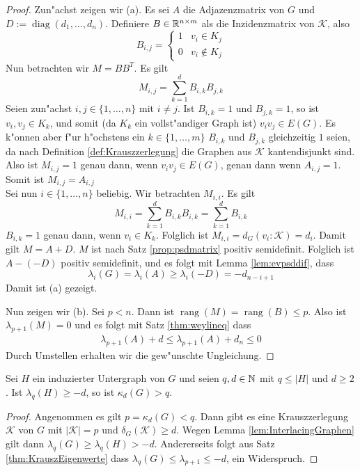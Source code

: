 \begin{proof}
    Zun"achst zeigen wir (a). Es sei $A$ die Adjazenzmatrix von $G$ und $D := \operatorname{diag}(d_1,\dots,d_n)$. Definiere $B\in{\mathbb{R}}^{n\times m}$ als die Inzidenzmatrix von $\mathcal K$, also $$B_{i,j} = \begin{cases}
        1 & v_i \in K_j \\ 0 & v_i \notin K_j
      \end{cases}$$ 
      Nun betrachten wir $M=BB^{T}$. Es gilt
      \[
        M_{i,j} = \sum\limits_{k=1}^{d}B_{i,k}B_{j,k}
      \]
      Seien zun"achst $i,j \in \{1,\dots,n\}$ mit $i\neq j$. Ist $B_{i,k} = 1$ und $B_{j,k} = 1$, so ist $v_i,v_j  \in K_k$, und somit (da $K_k$ ein vollst"andiger Graph ist) $v_iv_j\in E(G)$. Es k"onnen aber f"ur h"ochstens ein $k\in \{1,\dots,m\}$ $B_{i,k}$ und $B_{j,k}$ gleichzeitig $1$ seien, da nach Definition \ref{def:Krauszzerlegung} die Graphen aus $\mathcal K$ kantendisjunkt sind. Also ist $M_{i,j}= 1 $ genau dann, wenn $v_iv_j\in E(G)$, genau dann wenn $A_{i,j} = 1$. Somit ist $M_{i,j}=A_{i,j}$\\
      Sei nun $i\in\{1,\dots,n\}$ beliebig. Wir betrachten $M_{i,i}$. Es gilt 
      \[
        M_{i,i} = \sum\limits_{k=1}^{d}B_{i,k}B_{i,k} = \sum\limits_{k=1}^{d} B_{i,k}
      \]
      $B_{i,k}=1$ genau dann, wenn $v_i \in K_k$. Folglich ist $M_{i,i}= d_G(v_i:\mathcal K)= d_i$. Damit gilt $M=A+D$. $M$ ist nach Satz \ref{prop:psdmatrix} positiv semidefinit.
      Folglich ist $A- (-D)$ positiv semidefinit, und es folgt mit Lemma \ref{lem:evpsddif}, dass 
      \begin{equation*}
        \lambda_i(G) = \lambda_i(A) \geq \lambda_i(-D) = -d_{n-i+1}
      \end{equation*}
      Damit ist (a) gezeigt.

     Nun zeigen wir (b). Sei $p<n$. Dann ist $\operatorname{rang}(M)= \operatorname{rang}(B) \leq p$. Also ist $\lambda_{p+1}(M) = 0$ und es folgt mit Satz \ref{thm:weylineq} dass 
      \begin{align*}
        \lambda_{p+1}(A) + d \leq \lambda_{p+1}(A) + d_{n} \leq 0
      \end{align*}
      Durch Umstellen erhalten wir die gew"unschte Ungleichung.
\end{proof}
\begin{corollary}
  \label{cor:Korollar1}
  Sei $H$ ein induzierter Untergraph von $G$ und seien $q,d \in {\mathbb{N}}$ mit $q \leq |H|$ und $d \geq 2$.
  Ist $\lambda_{q}(H) \geq -d$, so ist $\kappa_{d}(G) > q$.
\end{corollary}
\begin{proof}
  Angenommen es gilt $p = \kappa_{d}(G) < q$. Dann gibt es  eine Krauszzerlegung $\mathcal{K}$ von $G$ mit $|\mathcal{K}| = p$ und $\delta_G(\mathcal{K}) \geq d$. Wegen Lemma \ref{lem:InterlacingGraphen} gilt dann $\lambda_{q}(G) \geq \lambda_{q}(H) > -d $. Andererseits folgt aus Satz \ref{thm:KrauszEigenwerte} dass $\lambda_{q}(G) \leq \lambda_{p+1} \leq -d $, ein Widerspruch. 
\end{proof}

